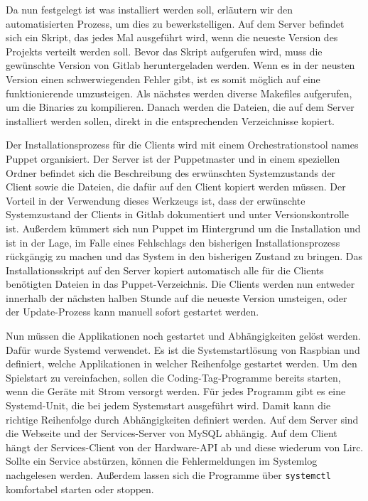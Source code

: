 Da nun festgelegt ist was installiert werden soll, erläutern wir den
automatisierten Prozess, um dies zu bewerkstelligen. Auf dem Server befindet
sich ein Skript, das jedes Mal ausgeführt wird, wenn die neueste Version des
Projekts verteilt werden soll. Bevor das Skript aufgerufen wird, muss die
gewünschte Version von Gitlab heruntergeladen werden. Wenn es in der neusten
Version einen schwerwiegenden Fehler gibt, ist es somit möglich auf eine
funktionierende umzusteigen. Als nächstes werden diverse Makefiles aufgerufen,
um die Binaries zu kompilieren. Danach werden die Dateien, die auf dem Server
installiert werden sollen, direkt in die entsprechenden Verzeichnisse kopiert.

Der Installationsprozess für die Clients wird mit einem Orchestrationstool
names Puppet organisiert. Der Server ist der Puppetmaster und in einem
speziellen Ordner befindet sich die Beschreibung des erwünschten Systemzustands
der Client sowie die Dateien, die dafür auf den Client kopiert werden müssen.
Der Vorteil in der Verwendung dieses Werkzeugs ist, dass der erwünschte
Systemzustand der Clients in Gitlab dokumentiert und unter Versionskontrolle
ist. Außerdem kümmert sich nun Puppet im Hintergrund um die Installation und
ist in der Lage, im Falle eines Fehlschlags den bisherigen Installationsprozess
rückgängig zu machen und das System in den bisherigen Zustand zu bringen. Das
Installationsskript auf den Server kopiert automatisch alle für die Clients
benötigten Dateien in das Puppet-Verzeichnis. Die Clients werden nun entweder
innerhalb der nächsten halben Stunde auf die neueste Version umsteigen, oder
der Update-Prozess kann manuell sofort gestartet werden.

Nun müssen die Applikationen noch gestartet und Abhängigkeiten gelöst werden.
Dafür wurde Systemd verwendet. Es ist die Systemstartlösung von Raspbian und
definiert, welche Applikationen in welcher Reihenfolge gestartet werden. Um
den Spielstart zu vereinfachen, sollen die Coding-Tag-Programme bereits starten,
wenn die Geräte mit Strom versorgt werden. Für jedes Programm gibt es eine
Systemd-Unit, die bei jedem Systemstart ausgeführt wird. Damit kann die
richtige Reihenfolge durch Abhängigkeiten definiert werden. Auf dem Server
sind die Webseite und der Services-Server von MySQL abhängig. Auf dem Client
hängt der Services-Client von der Hardware-API ab und diese wiederum von Lirc.
Sollte ein Service abstürzen, können die Fehlermeldungen im Systemlog
nachgelesen werden. Außerdem lassen sich die Programme über \texttt{systemctl}
komfortabel starten oder stoppen.

